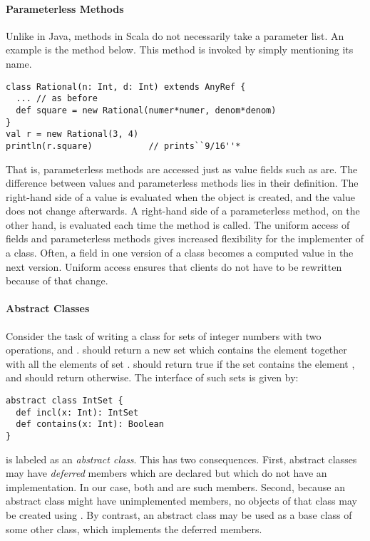 \paragraph{Parameterless Methods}
Unlike in Java, methods in Scala do not necessarily take a
parameter list. An example is the  method below. This
method is invoked by simply mentioning its name. 
\begin{lstlisting}
class Rational(n: Int, d: Int) extends AnyRef {
  ... // as before
  def square = new Rational(numer*numer, denom*denom)
}
val r = new Rational(3, 4)
println(r.square)           // prints``9/16''*
\end{lstlisting}
That is, parameterless methods are accessed just as value fields such
as  are. The difference between values and parameterless
methods lies in their definition. The right-hand side of a value is
evaluated when the object is created, and the value does not change
afterwards. A right-hand side of a parameterless method, on the other
hand, is evaluated each time the method is called.  The uniform access
of fields and parameterless methods gives increased flexibility for
the implementer of a class. Often, a field in one version of a class
becomes a computed value in the next version. Uniform access ensures
that clients do not have to be rewritten because of that change.

\paragraph{Abstract Classes}

Consider the task of writing a class for sets of integer numbers with
two operations,  and . 
should return a new set which contains the element  together
with all the elements of set .  should
return true if the set  contains the element , and
should return  otherwise. The interface of such sets is
given by:  
\begin{lstlisting}
abstract class IntSet {
  def incl(x: Int): IntSet
  def contains(x: Int): Boolean
}
\end{lstlisting}
 is labeled as an \emph{abstract class}. This has two
consequences.  First, abstract classes may have {\em deferred} members
which are declared but which do not have an implementation. In our
case, both  and  are such members. Second,
because an abstract class might have unimplemented members, no objects
of that class may be created using . By contrast, an
abstract class may be used as a base class of some other class, which
implements the deferred members.

